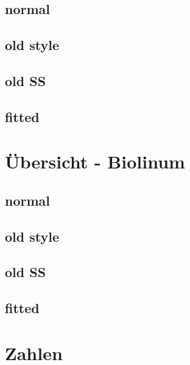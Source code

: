 \documentclass{fontdokuold}
\begin{document}
\subsection{normal}

\subsection{old style}

\subsection{old SS}

\subsection{fitted}

\section{Übersicht - Biolinum}

\subsection{normal}

\subsection{old style}

\subsection{old SS}

\subsection{fitted}

\section{Zahlen}

\begin{minipage}{\linewidth}
\begin{minipage}{.45\linewidth}
\Large
{}
\end{minipage}\hfill
\begin{minipage}{.45\linewidth}
\Large
{}
\end{minipage}
\end{minipage}
\end{document}
